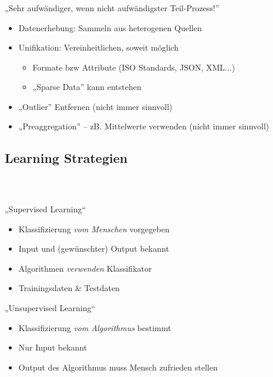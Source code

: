 \begin{frame}
    \frametitle{\insertsubsection}
    „Sehr aufwändiger, wenn nicht aufwändigster Teil-Prozess!” \cite{pocket2014}
    \vspace{1em}
    \begin{itemize}
        \setlength\itemsep{1em}
        \item Datenerhebung: Sammeln aus heterogenen Quellen
        \item Unifikation: Vereinheitlichen, soweit möglich
            \begin{itemize}
                \setlength\itemsep{0.5em}
                \item Formate bzw Attribute (ISO Standards, JSON, XML...)
                \item „Sparse Data” kann entstehen
            \end{itemize}
        \item „Outlier” Entfernen (nicht immer sinnvoll)
        \item „Preaggregation” -- zB. Mittelwerte verwenden (nicht immer sinnvoll)
    \end{itemize}
\end{frame}

\subsection{Learning Strategien}

\begin{frame}
    \frametitle{\insertsubsection \ \cite{datamining2011}}
    \begin{block}{„Supervised Learning“}
        \vspace{0.5em}
        \begin{itemize}
            \setlength\itemsep{0.5em}
            \item Klassifizierung \emph{vom Menschen} vorgegeben
            \item Input und (gewünschter) Output bekannt
            \item Algorithmen \emph{verwenden} Klassifikator
            \item Trainingsdaten \& Testdaten
        \end{itemize}
    \end{block}
    \vspace{0.8em}
    \begin{block}{„Unsupervised Learning“}
        \vspace{0.5em}
        \begin{itemize}
            \setlength\itemsep{0.5em}
            \item Klassifizierung \emph{vom Algorithmus} bestimmt
            \item Nur Input bekannt
            \item Output des Algorithmus muss Mensch zufrieden stellen
        \end{itemize}
    \end{block}
\end{frame}


